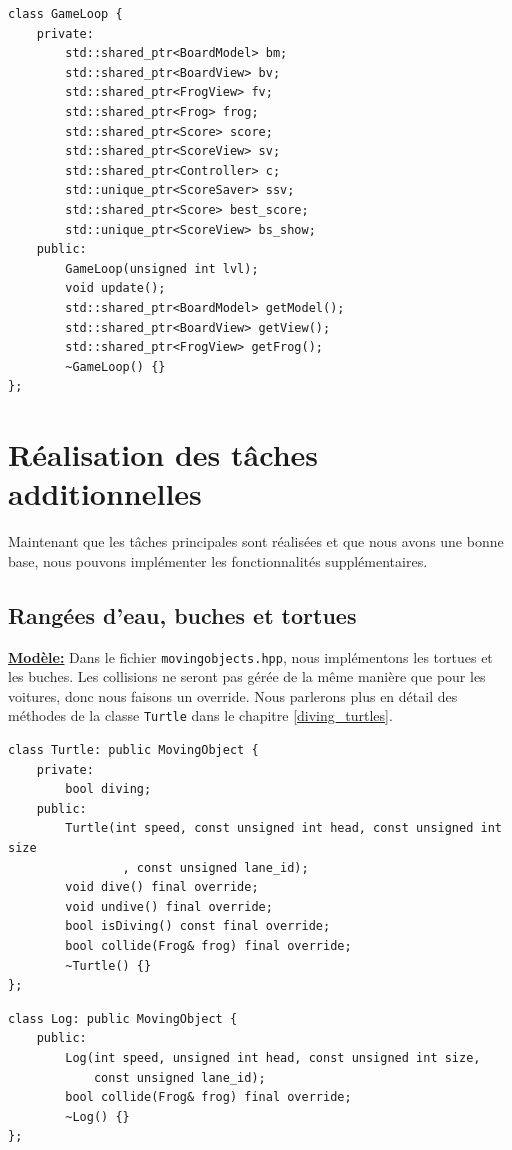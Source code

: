 \documentclass[a4paper, 12pt]{article}
\begin{document}
\begin{lstlisting}
class GameLoop {
    private:
        std::shared_ptr<BoardModel> bm;
        std::shared_ptr<BoardView> bv;
        std::shared_ptr<FrogView> fv;
        std::shared_ptr<Frog> frog;
        std::shared_ptr<Score> score;
        std::shared_ptr<ScoreView> sv;
        std::shared_ptr<Controller> c;
        std::unique_ptr<ScoreSaver> ssv;
        std::shared_ptr<Score> best_score;
        std::unique_ptr<ScoreView> bs_show;
    public:
        GameLoop(unsigned int lvl);
        void update();
        std::shared_ptr<BoardModel> getModel();
        std::shared_ptr<BoardView> getView();
        std::shared_ptr<FrogView> getFrog();
        ~GameLoop() {}
};
\end{lstlisting}

\section{Réalisation des tâches additionnelles}
Maintenant que les tâches principales sont réalisées et que nous avons une bonne base, nous pouvons implémenter les fonctionnalités supplémentaires. 

\subsection{Rangées d'eau, buches et tortues} \label{turtle_class}

\underline{\textbf{Modèle:}} 
Dans le fichier \texttt{movingobjects.hpp}, nous implémentons les tortues et les buches. Les collisions ne seront pas gérée de la même manière que pour les voitures, donc nous faisons un override. Nous parlerons plus en détail des méthodes de la classe \texttt{Turtle} dans le chapitre \ref{diving_turtles}. \\

\begin{lstlisting}
class Turtle: public MovingObject {
    private:
        bool diving;
    public:
        Turtle(int speed, const unsigned int head, const unsigned int size
                , const unsigned lane_id);
        void dive() final override;
        void undive() final override;
        bool isDiving() const final override;
        bool collide(Frog& frog) final override;
        ~Turtle() {}
};
\end{lstlisting}

\begin{lstlisting}
class Log: public MovingObject {
    public:
        Log(int speed, unsigned int head, const unsigned int size,
            const unsigned lane_id);
        bool collide(Frog& frog) final override;
        ~Log() {}
};
\end{lstlisting} \hspace{0.5cm}
\end{document}
